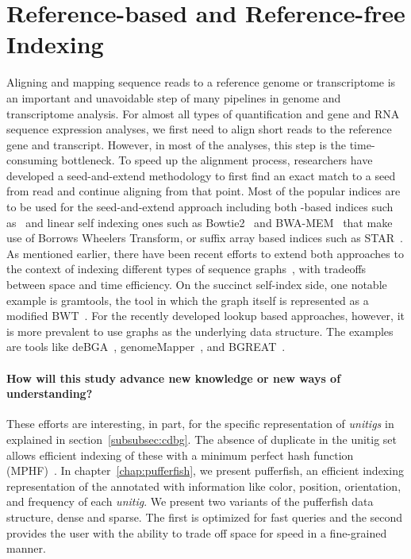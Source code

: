 \section{Reference-based and Reference-free Indexing}
\label{subsec:indexing}
Aligning and mapping sequence reads to a reference genome or transcriptome
is an important and unavoidable step
of many pipelines in genome and transcriptome analysis.
For almost all types of quantification and gene and RNA sequence expression analyses,
we first need to align short reads to the reference gene and transcript. However,
in most of the analyses, this step is the time-consuming bottleneck.
To speed up the alignment process, researchers have developed a seed-and-extend methodology
to first find an exact match to a seed from read and continue aligning from that point.
Most of the popular indices are to be used for the seed-and-extend approach including both
\kmer-based indices such as~\cite{liao2013subread}
and linear self indexing ones such as Bowtie2~\cite{langmead2012fast}
and BWA-MEM~\cite{li2013aligning} that make use of Borrows Wheelers Transform,
or suffix array based indices such as STAR~\cite{dobin2013star}.
As mentioned earlier, there have been recent efforts to extend both approaches to the context
of indexing different types of sequence graphs~\cite{paten2017genome},
with tradeoffs between space and time efficiency.
On the succinct self-index side, one notable example is gramtools, the tool in which the graph itself
is represented as a modified BWT~\cite{maciuca2016natural}.
For the recently developed \kmer lookup based approaches, however,
it is more prevalent to use graphs as the underlying data structure.
The examples are tools like deBGA~\cite{liu2016debga},
genomeMapper~\cite{schneeberger2009simultaneous}, and BGREAT~\cite{limasset2016read}.

\paragraph*{How will this study advance new knowledge or new ways of understanding?}
These efforts are interesting, in part, for the specific representation of \emph{unitigs}
in \ccdbgs explained in section~\ref{subsubsec:cdbg}.
The absence of duplicate \kmers in the unitig set allows efficient indexing of these \kmers
with a minimum perfect hash function (MPHF)~\cite{limasset2017fast}.
In chapter~\ref{chap:pufferfish}, we present pufferfish, an efficient indexing representation of the \ccdbg
annotated with information like color, position, orientation, and frequency of each \emph{unitig}.
We present two variants of the pufferfish data structure, dense and sparse.
The first is optimized for fast queries
and the second provides the user with the ability to trade off space for speed in a fine-grained manner.

